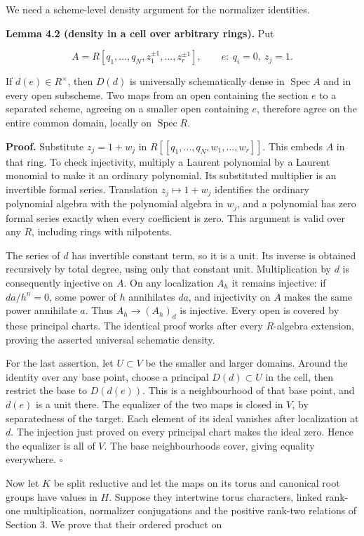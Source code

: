 \documentclass[11pt,a4paper,openany]{report}
\begin{document}
We need a scheme-level density argument for the normalizer identities.

\textbf{Lemma 4.2 (density in a cell over arbitrary rings).} Put

\[
A=R[q_1,\ldots,q_N,z_1^{\pm1},\ldots,z_r^{\pm1}],
\qquad e:\ q_i=0,\ z_j=1.
\]

If \(d(e)\in R^\times\), then \(D(d)\) is universally schematically dense in \(\operatorname{Spec}A\) and in every open subscheme. Two maps from an open containing the section \(e\) to a separated scheme, agreeing on a smaller open containing \(e\), therefore agree on the entire common domain, locally on \(\operatorname{Spec}R\).

\textbf{Proof.} Substitute \(z_j=1+w_j\) in \(R[[q_1,\ldots,q_N,w_1,\ldots,w_r]]\). This embeds \(A\) in that ring. To check injectivity, multiply a Laurent polynomial by a Laurent monomial to make it an ordinary polynomial. Its substituted multiplier is an invertible formal series. Translation \(z_j\mapsto1+w_j\) identifies the ordinary polynomial algebra with the polynomial algebra in \(w_j\), and a polynomial has zero formal series exactly when every coefficient is zero. This argument is valid over any \(R\), including rings with nilpotents.

The series of \(d\) has invertible constant term, so it is a unit. Its inverse is obtained recursively by total degree, using only that constant unit. Multiplication by \(d\) is consequently injective on \(A\). On any localization \(A_h\) it remains injective: if \(da/h^n=0\), some power of \(h\) annihilates \(da\), and injectivity on \(A\) makes the same power annihilate \(a\). Thus \(A_h\to(A_h)_d\) is injective. Every open is covered by these principal charts. The identical proof works after every \(R\)-algebra extension, proving the asserted universal schematic density.

For the last assertion, let \(U\subset V\) be the smaller and larger domains. Around the identity over any base point, choose a principal \(D(d)\subset U\) in the cell, then restrict the base to \(D(d(e))\). This is a neighbourhood of that base point, and \(d(e)\) is a unit there. The equalizer of the two maps is closed in \(V\), by separatedness of the target. Each element of its ideal vanishes after localization at \(d\). The injection just proved on every principal chart makes the ideal zero. Hence the equalizer is all of \(V\). The base neighbourhoods cover, giving equality everywhere. \(\square\)

Now let \(K\) be split reductive and let the maps on its torus and canonical root groups have values in \(H\). Suppose they intertwine torus characters, linked rank-one multiplication, normalizer conjugations and the positive rank-two relations of Section 3. We prove that their ordered product on
\end{document}
